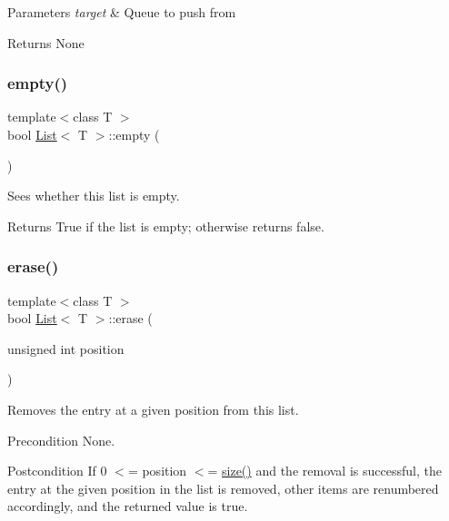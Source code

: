 \begin{DoxyParams}{Parameters}
{\em target} & Queue to push from \\
\hline
\end{DoxyParams}
\begin{DoxyReturn}{Returns}
None 
\end{DoxyReturn}
\mbox{\label{class_list_a3737ca60365287ce663393d8c07d1a41}} 
\subsubsection{\texorpdfstring{empty()}{empty()}}
{\footnotesize\ttfamily template$<$class T $>$ \\
bool \hyperlink{class_list}{List}$<$ T $>$\+::empty (\begin{DoxyParamCaption}{ }\end{DoxyParamCaption})}

Sees whether this list is empty. \begin{DoxyReturn}{Returns}
True if the list is empty; otherwise returns false. 
\end{DoxyReturn}
\mbox{\label{class_list_a0af93f391664cbd3476b1a0fe0d3619e}} 
\subsubsection{\texorpdfstring{erase()}{erase()}}
{\footnotesize\ttfamily template$<$class T $>$ \\
bool \hyperlink{class_list}{List}$<$ T $>$\+::erase (\begin{DoxyParamCaption}\item[{unsigned int}]{position }\end{DoxyParamCaption})}

Removes the entry at a given position from this list. \begin{DoxyPrecond}{Precondition}
None. 
\end{DoxyPrecond}
\begin{DoxyPostcond}{Postcondition}
If 0 $<$= position $<$= \hyperlink{class_list_aec8852ab225094e14ad424e8d71a4dac}{size()} and the removal is successful, the entry at the given position in the list is removed, other items are renumbered accordingly, and the returned value is true. 
\end{DoxyPostcond}

